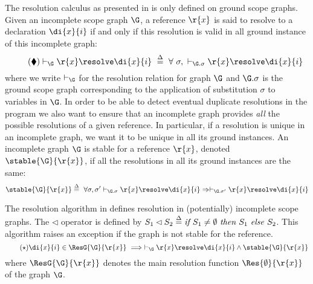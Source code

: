 The resolution calculus as presented in  is only defined on ground scope graphs. Given an incomplete scope graph $\G$, a reference $\r{x}$ is said to resolve to a declaration $\di{x}{i}$ if and only if this resolution is valid in all ground instance of this incomplete graph:\vspace*{-2mm}
\begin{equation}\tag{$\blacklozenge$}
  \label{eq:nameres}
 \vdash_\G \r{x} \resolve \di{x}{i} \ \stackrel{\Delta}{=}\ \forall\ \sigma,\ \vdash_{\G.\sigma} \r{x} \resolve \di{x}{i}     \vspace*{-2mm}
\end{equation}
where we write $\vdash_\G$ for the resolution relation for graph $\G$ and 
$\G.\sigma$ is the ground scope graph corresponding to the application of substitution $\sigma$ to variables in $\G$.
In order to be able to detect eventual duplicate resolutions in the program we also want to ensure that an incomplete graph
provides \emph{all} the possible resolutions of a given reference. In particular, if a resolution is unique in an incomplete graph, we want it to be unique in all its ground instances. 
An incomplete graph $\G$ is stable for a reference $\r{x}$, denoted $\stable{\G}{\r{x}}$, if all the resolutions in all its ground instances are the same:\vspace*{-2mm}
$$\stable{\G}{\r{x}} \stackrel{\Delta}{=}\ \forall \sigma, \sigma' \vdash_{\G.\sigma} \r{x} \resolve \di{x}{i} \Rightarrow \vdash_{\G.\sigma'} \r{x} \resolve \di{x}{i}\vspace*{-2mm}$$

The resolution algorithm in  defines resolution in (potentially) incomplete scope graphs. The $\lhd$ operator is defined by $S_1 \lhd S_2 \stackrel{\Delta}{=} \text{\it if }S_1 \neq \emptyset\ \text{\it then } S_1\ \text{\it else } S_2$.
 This algorithm raises an 
exception if the graph is not stable for the reference.\vspace*{-2mm}
\begin{equation}\tag{$\star$}
  \label{eq:nameresspec}
\di{x}{i} \in \ResG{\G}{\r{x}}\ \Longrightarrow\ \vdash_\G \r{x} \resolve \di{x}{i} \wedge \stable{\G}{\r{x}} \vspace*{-2mm}
\end{equation}
where $\ResG{\G}{\r{x}}$ denotes the main resolution function $\Res{\emptyset}{\r{x}}$ of the graph $\G$.

